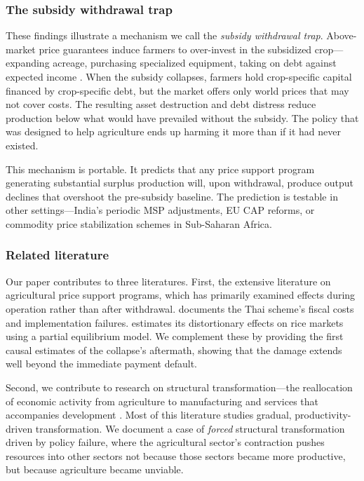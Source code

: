 \documentclass[12pt]{article}
\begin{document}
\subsubsection*{The subsidy withdrawal trap} These findings illustrate a mechanism we call the \textit{subsidy withdrawal trap}. Above-market price guarantees induce farmers to over-invest in the subsidized crop---expanding acreage, purchasing specialized equipment, taking on debt against expected income \citep{permani2016}. When the subsidy collapses, farmers hold crop-specific capital financed by crop-specific debt, but the market offers only world prices that may not cover costs. The resulting asset destruction and debt distress reduce production below what would have prevailed without the subsidy. The policy that was designed to help agriculture ends up harming it more than if it had never existed.

This mechanism is portable. It predicts that any price support program generating substantial surplus production will, upon withdrawal, produce output declines that overshoot the pre-subsidy baseline. The prediction is testable in other settings---India's periodic MSP adjustments, EU CAP reforms, or commodity price stabilization schemes in Sub-Saharan Africa.

\subsubsection*{Related literature} Our paper contributes to three literatures. First, the extensive literature on agricultural price support programs, which has primarily examined effects during operation rather than after withdrawal. \citet{poapongsakorn2014} documents the Thai scheme's fiscal costs and implementation failures. \citet{permani2016} estimates its distortionary effects on rice markets using a partial equilibrium model. We complement these by providing the first causal estimates of the collapse's aftermath, showing that the damage extends well beyond the immediate payment default.

Second, we contribute to research on structural transformation---the reallocation of economic activity from agriculture to manufacturing and services that accompanies development \citep{herrendorf2014, mcmillan2014}. Most of this literature studies gradual, productivity-driven transformation. We document a case of \textit{forced} structural transformation driven by policy failure, where the agricultural sector's contraction pushes resources into other sectors not because those sectors became more productive, but because agriculture became unviable.
\end{document}

